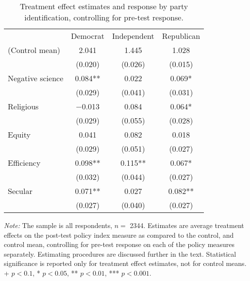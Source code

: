 \begin{table*}

\caption{Treatment effect estimates and response by party identification, controlling for pre-test response.\label{tab:party_lin}}
\centering
\begin{threeparttable}
\begin{tabular}[t]{lccc}
\toprule
  & Democrat & Independent & Republican\\
\cmidrule(lr){2-2} \cmidrule(lr){3-3} \cmidrule(lr){4-4}
(Control mean) & \num{2.041} & \num{1.445} & \num{1.028}\\
 & (\num{0.020}) & (\num{0.026}) & (\num{0.015})\\
Negative science & \num{0.084}** & \num{0.022} & \num{0.069}*\\
 & (\num{0.029}) & (\num{0.041}) & (\num{0.031})\\
Religious & \num{-0.013} & \num{0.084} & \num{0.064}*\\
 & (\num{0.029}) & (\num{0.055}) & (\num{0.028})\\
Equity & \num{0.041} & \num{0.082} & \num{0.018}\\
 & (\num{0.029}) & (\num{0.051}) & (\num{0.027})\\
Efficiency & \num{0.098}** & \num{0.115}** & \num{0.067}*\\
 & (\num{0.032}) & (\num{0.044}) & (\num{0.027})\\
Secular & \num{0.071}** & \num{0.027} & \num{0.082}**\\
 & (\num{0.027}) & (\num{0.040}) & (\num{0.027})\\
\bottomrule
\end{tabular}
\begin{tablenotes}
\item \footnotesize \textit{Note:} The sample is all respondents, $n = $ \num{2344}. Estimates are average treatment effects on the post-test policy index measure as compared to the control, and control mean, controlling for pre-test response on each of the policy measures separately. Estimating procedures are discussed further in the text. Statistical significance is reported only for treatment effect estimates, not for control means. + $p < 0.1$, * $p < 0.05$, ** $p < 0.01$, *** $p < 0.001$.
\end{tablenotes}
\end{threeparttable}
\end{table*}
